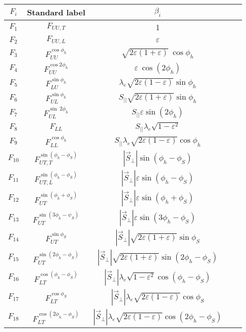 \documentclass[floatfix,aps,prd,nofootinbib,superscriptaddress,preprint]{revtex4}
\newcommand\3[1]{\boldsymbol{#1}}
\begin{document}
\begin{table}[h!]
\begin{tabular}{|c|c|c|c|c|}
\hline
$F_i$    & Standard label                    & $\beta_i$\\\hline
$F_1$    & $F_{UU,T}$                        & 1\\\hline
$F_2$    & $F_{UU,L}$                        & $\varepsilon$\\\hline
$F_3$    & $F_{UU}^{\cos \phi_h}$            & $\sqrt{2\varepsilon (1+\varepsilon)} ~ \cos\phi_h$\\\hline
$F_4$    & $F_{UU}^{\cos 2\phi_h}$           & $\varepsilon ~ \cos(2\phi_h)$\\\hline
$F_5$    & $F_{LU}^{\sin\phi_h}$             & $\lambda_e\sqrt{2\varepsilon (1-\varepsilon)} \sin\phi_h $\\\hline
$F_6$    & $F_{UL}^{\sin\phi_h}$             & $S_{||}\sqrt{2\varepsilon (1+\varepsilon)}\sin\phi_h$\\\hline
$F_7$    & $F_{UL}^{\sin ~ 2\phi_h}$         & $S_{||}\varepsilon \sin(2\phi_h)$\\\hline
$F_8$    & $F_{LL}$                          & $S_{||} \lambda_e \sqrt{1-\varepsilon^2}$\\\hline
$F_9$    & $F_{LL}^{\cos\phi_h}$             & $S_{||} \lambda_e  \sqrt{2\varepsilon(1-\varepsilon)} \cos\phi_h$\\\hline
$F_{10}$ & $F_{UT,T}^{\sin(\phi_h-\phi_S)}$  & $|\vec{S}_\perp|\sin(\phi_h-\phi_S)$\\\hline
$F_{11}$ & $F_{UT,L}^{\sin(\phi_h-\phi_S)}$  & $|\vec{S}_\perp|\varepsilon\sin(\phi_h-\phi_S)$\\\hline
$F_{12}$ & $F_{UT}^{\sin(\phi_h+\phi_S)}$    & $|\vec{S}_\perp|\varepsilon\sin(\phi_h+\phi_S)$\\\hline
$F_{13}$ & $F_{UT}^{\sin(3\phi_h - \psi_S)}$ & $|\vec{S}_\perp| \varepsilon \sin(3\phi_h - \phi_S)$\\\hline
$F_{14}$ & $F_{UT}^{\sin\phi_S}$             & $|\vec{S}_\perp| \sqrt{2\varepsilon (1+\varepsilon)}\sin\phi_S$\\\hline
$F_{15}$ & $F_{UT}^{\sin(2\phi_h-\phi_S)}$   & $|\vec{S}_\perp| \sqrt{2\varepsilon (1+\varepsilon)}\sin(2\phi_h-\phi_S)$\\\hline
$F_{16}$ & $F_{LT}^{\cos(\phi_h-\phi_S)}$    & $|\vec{S}_\perp|\lambda_e \sqrt{1-\varepsilon^2}\cos(\phi_h-\phi_S)$\\\hline
$F_{17}$ & $F_{LT}^{ \cos\phi_S}$            & $|\vec{S}_\perp|\lambda_e \sqrt{2\varepsilon(1-\varepsilon)} \cos\phi_S$\\\hline
$F_{18}$ & $F_{LT}^{\cos(2\phi_h-\phi_S)}$   & $|\vec{S}_\perp|\lambda_e \sqrt{2\varepsilon(1-\varepsilon)} \cos(2\phi_h-\phi_S)$\\\hline
\end{tabular}
\end{table}
\end{document}
